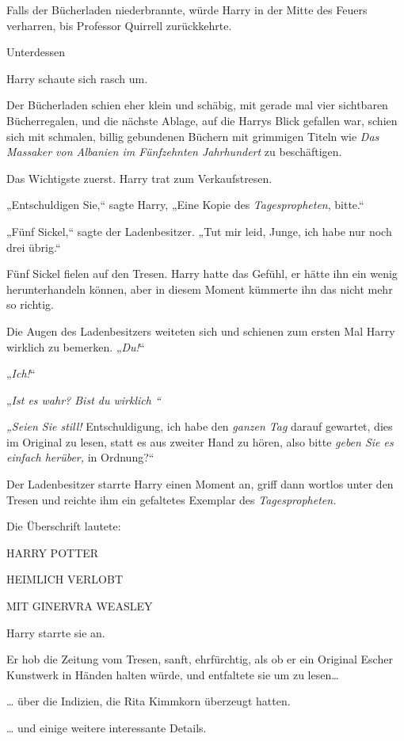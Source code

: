 {Falls der Bücherladen niederbrannte, würde Harry in der Mitte des Feuers verharren, bis Professor Quirrell zurückkehrte.

Unterdessen \later

Harry schaute sich rasch um.

Der Bücherladen schien eher klein und schäbig, mit gerade mal vier sichtbaren Bücherregalen, und die nächste Ablage, auf die Harrys Blick gefallen war, schien sich mit schmalen, billig gebundenen Büchern mit grimmigen Titeln wie \emph{Das Massaker von Albanien im Fünfzehnten Jahrhundert} zu beschäftigen.

Das Wichtigste zuerst. Harry trat zum Verkaufstresen.

„Entschuldigen Sie,“ sagte Harry, „Eine Kopie des \emph{Tagespropheten}, bitte.“

„Fünf Sickel,“ sagte der Ladenbesitzer. „Tut mir leid, Junge, ich habe nur noch drei übrig.“

Fünf Sickel fielen auf den Tresen. Harry hatte das Gefühl, er hätte ihn ein wenig herunterhandeln können, aber in diesem Moment kümmerte ihn das nicht mehr so richtig.

Die Augen des Ladenbesitzers weiteten sich und schienen zum ersten Mal Harry wirklich zu bemerken. „\emph{Du!}“

„\emph{Ich!}“

„\emph{Ist es wahr? Bist du wirklich \later“}

\emph{„Seien Sie still!} Entschuldigung, ich habe den \emph{ganzen Tag} darauf gewartet, dies im Original zu lesen, statt es aus zweiter Hand zu hören, also bitte \emph{geben Sie es einfach herüber,} in Ordnung?“

Der Ladenbesitzer starrte Harry einen Moment an, griff dann wortlos unter den Tresen und reichte ihm ein gefaltetes Exemplar des \emph{Tagespropheten.}

Die Überschrift lautete:

HARRY POTTER

HEIMLICH VERLOBT

MIT GINERVRA WEASLEY

Harry starrte sie an.

Er hob die Zeitung vom Tresen, sanft, ehrfürchtig, als ob er ein Original Escher Kunstwerk in Händen halten würde, und entfaltete sie um zu lesen…

… über die Indizien, die Rita Kimmkorn überzeugt hatten.

… und einige weitere interessante Details.

}
